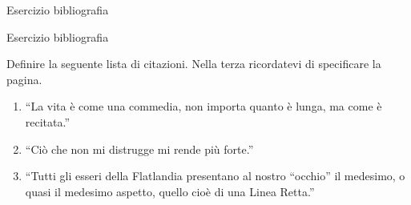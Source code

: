 \begin{frame}[fragile]{Esercizio bibliografia}

\begin{esercizio}{Esercizio bibliografia}
    
Definire la seguente lista di citazioni.
Nella terza ricordatevi di specificare la pagina.

\begin{enumerate}
\item ``La vita è come una commedia, non importa quanto è lunga, ma come è recitata.'' \cite{seneca}
\item ``Ciò che non mi distrugge mi rende più forte.'' \cite{nietzsche}
\item ``Tutti gli esseri della Flatlandia presentano al nostro ``occhio'' il medesimo, o quasi il medesimo aspetto, quello cioè di una Linea Retta.'' \cite[p. 42]{abbot}
\end{enumerate}

\end{esercizio}

\end{frame}
